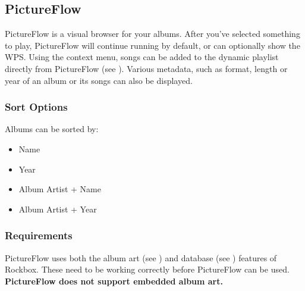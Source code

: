 \subsection{PictureFlow}
PictureFlow is a visual browser for your albums.  After you've selected something to play,
PictureFlow will continue running by default, or can optionally show the WPS. Using
the context menu, songs can be added to the dynamic playlist directly from PictureFlow
(see ).
Various metadata, such as format, length or year of an album or its songs can also be
displayed.


\subsubsection{Sort Options}
Albums can be sorted by:

\begin{itemize}
    \item Name
    \item Year
    \item Album Artist + Name
    \item Album Artist + Year
\end{itemize}

\subsubsection{Requirements}
PictureFlow uses both the album art (see ) and
database (see ) features of Rockbox.
These need to be working correctly before PictureFlow can be used.
\textbf{PictureFlow does not support embedded album art.}




